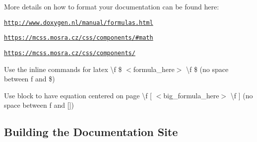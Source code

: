 \begin{DoxyItemize}
\item More details on how to format your documentation can be found here\+:
\begin{DoxyItemize}
\item \href{http://www.doxygen.nl/manual/formulas.html}{\tt http\+://www.\+doxygen.\+nl/manual/formulas.\+html}
\item \href{https://mcss.mosra.cz/css/components/#math}{\tt https\+://mcss.\+mosra.\+cz/css/components/\#math}
\item \href{https://mcss.mosra.cz/css/components/}{\tt https\+://mcss.\+mosra.\+cz/css/components/}
\end{DoxyItemize}
\item Use the inline commands for latex {\ttfamily \textbackslash{}f \$ $<$formula\+\_\+here$>$ \textbackslash{}f \$} (no space between f and \$)
\item Use block to have equation centered on page {\ttfamily \textbackslash{}f \mbox{[} $<$big\+\_\+formula\+\_\+here$>$ \textbackslash{}f \mbox{]}} (no space between f and \mbox{[}\mbox{]})
\end{DoxyItemize}\hypertarget{dev-docs_developers-building}{}\subsection{Building the Documentation Site}\label{dev-docs_developers-building}

